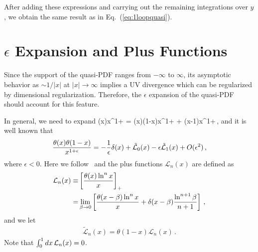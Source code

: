 After adding these expressions and carrying out the remaining integrations over $y$, we obtain the same result as in Eq.~(\ref{eq:1loopquasi}).


\section{$\epsilon$ Expansion and Plus Functions}
\label{sec:ep}

Since the support of the quasi-PDF ranges from $-\infty$ to $\infty$, its asymptotic behavior as $\sim1/|x|$ at $|x|\to\infty$ implies a UV divergence which can be regularized by dimensional regularization. Therefore, the $\epsilon$ expansion of the quasi-PDF should account for this feature.

In general, we need to expand
\beq
	{\theta(x)\over x^{1+\epsilon}} = {\theta(x)\theta(1-x)\over x^{1+\epsilon}} + {\theta(x-1)\over x^{1+\epsilon}}\,,
\eeq
and it is well known that
\begin{align} \label{eq:ident}
{\theta(x)\theta(1-x)\over x^{1+\epsilon}} = - {1\over\epsilon}\delta(x)+
\tilde{\mathcal{L}}_0(x) - \epsilon \tilde{\mathcal{L}}_1(x)+ O(\epsilon^2)\,,
\end{align}
where $\epsilon<0$.
Here we follow~\cite{Ligeti:2008ac} and the plus functions $\mathcal{L}_n(x)$ are defined as
\begin{align} \label{eq:plus1}
	\mathcal{L}_n(x)\equiv &\left[ {\theta(x)\ln^nx\over x}\right]_+
   \\
	= &\lim_{\beta\to0} \left[{\theta(x-\beta)\ln^n x\over x} + \delta(x-\beta) {\ln^{n+1}\beta \over n+1}\right]
 \,, \nonumber
\end{align}
and we let
\begin{align}
  \tilde{\mathcal{L}}_n(x) = \theta(1-x) \mathcal{L}_n(x) \,.
\end{align}
Note that  $\int_0^1 dx \, {\cal L}_n(x) =0$.

